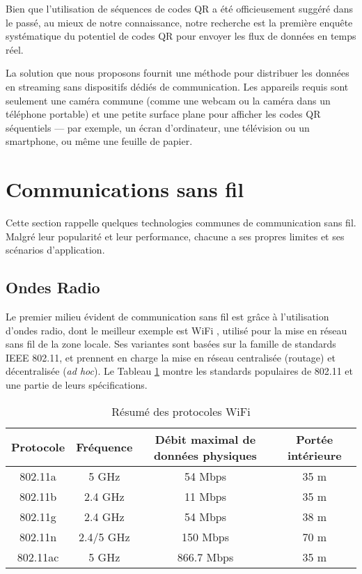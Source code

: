 Bien que l'utilisation de séquences de codes QR a été officieusement suggéré dans le passé, au mieux de notre connaissance, notre recherche est la première enquête systématique du potentiel de codes QR pour envoyer les flux de données en temps réel.

La solution que nous proposons fournit une méthode pour distribuer les données en streaming sans dispositifs dédiés de communication. Les appareils requis sont seulement une caméra commune (comme une webcam ou la caméra dans un téléphone portable) et une petite surface plane pour afficher les codes QR séquentiels --- par exemple, un écran d'ordinateur, une télévision ou un smartphone, ou même une feuille de papier.

\section{Communications sans fil}\label{sec:qr:reading} %

Cette section rappelle quelques technologies communes de communication sans fil. Malgré leur popularité et leur performance, chacune a ses propres limites et ses scénarios d'application.

\subsection{Ondes Radio}

Le premier milieu évident de communication sans fil est grâce à l'utilisation d'ondes radio, dont le meilleur exemple est WiFi \citep{Comer:2008:CNI:1816918}, utilisé pour la mise en réseau sans fil de la zone locale. Ses variantes sont basées sur la famille de standards IEEE 802.11, et prennent en charge la mise en réseau centralisée (routage) et décentralisée (\textit{ad hoc}). Le Tableau \ref{tab:qr:wifi-protocol} montre les standards populaires de 802.11 et une partie de leurs spécifications.

\begin{table}[ht]
\begin{center}
\begin{tabular}{|c|c|c|c|}
\hline
Protocole &	Fréquence & Débit maximal de données physiques	&	Portée intérieure \\
\hline
802.11a &	5 GHz &	54 Mbps &	35 m \\
\hline
802.11b &	2.4 GHz &	11 Mbps &	35 m\\
\hline
802.11g &	2.4 GHz &	54 Mbps &	38 m\\
\hline
802.11n &	2.4/5 GHz &	150 Mbps &	70 m\\
\hline
802.11ac &	5 GHz &	866.7 Mbps & 35 m\\
\hline
\end{tabular}
\caption{Résumé des protocoles WiFi \citep{theng2008ubiquitous,perahia2013next}}
\label{tab:qr:wifi-protocol}
\end{center}
\end{table}

